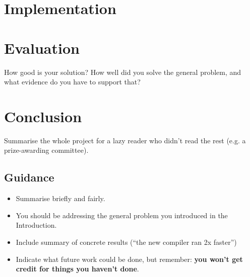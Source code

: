 \documentclass[british]{l4proj}
\begin{document}
\chapter{Implementation}
\label{ch:implementation}













\chapter{Evaluation}
\label{ch:evaluation}
How good is your solution? How well did you solve the general problem, and what evidence do you have to support that?

\chapter{Conclusion}
\label{ch:conclusion}
Summarise the whole project for a lazy reader who didn't read the rest (e.g. a prize-awarding committee).
\section{Guidance}
\begin{itemize}
    \item
        Summarise briefly and fairly.
    \item
        You should be addressing the general problem you introduced in the
        Introduction.
    \item
        Include summary of concrete results (``the new compiler ran 2x
        faster'')
    \item
        Indicate what future work could be done, but remember: \textbf{you
        won't get credit for things you haven't done}.
\end{itemize}
\end{document}
